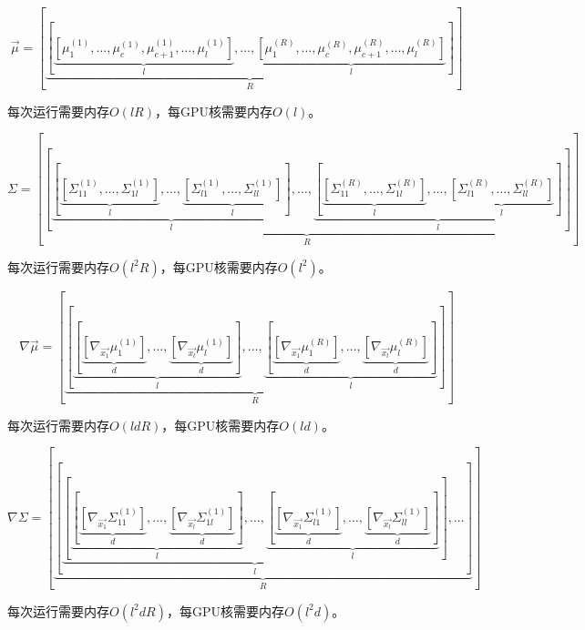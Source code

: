 \documentclass[index]{subfiles}
\begin{document}
\begin{equation}
    \vec{\mu} = \left[ \underbrace{\left[ \underbrace{\left[\mu_{1}^{(1)}, \ldots, \mu_{c}^{(1)}, \mu_{c+1}^{(1)}, \ldots, \mu_{l}^{(1)} \right]}_{l}, \ldots, \underbrace{\left[\mu_{1}^{(R)}, \ldots, \mu_{c}^{(R)}, \mu_{c+1}^{(R)}, \ldots, \mu_{l}^{(R)} \right]}_{l} \right]}_{R} \right]
\end{equation}

每次运行需要内存$O(lR)$，每GPU核需要内存$O(l)$。

\begin{equation}
    \Sigma = \left[ \underbrace{ \left[ \underbrace{ \left[ \underbrace{ \left[ \Sigma_{11}^{(1)}, \ldots, \Sigma_{1l}^{(1)} \right]}_{l}, \ldots, \underbrace{ \left[ \Sigma_{l1}^{(1)}, \ldots, \Sigma_{ll}^{(1)} \right]}_{l} \right] }_{l}, \ldots, \underbrace{ \left[ \underbrace{ \left[ \Sigma_{11}^{(R)}, \ldots, \Sigma_{1l}^{(R)} \right]}_{l}, \ldots, \underbrace{ \left[ \Sigma_{l1}^{(R)}, \ldots, \Sigma_{ll}^{(R)} \right]}_{l} \right] }_{l}  \right]}_{R}\right]
\end{equation}

每次运行需要内存$O(l^{2}R)$，每GPU核需要内存$O(l^{2})$。

\begin{equation}
    \nabla \vec{\mu} = \left[ \underbrace{ \left[ \underbrace{ \left[ \underbrace{ \left[ \nabla_{\vec{x_{1}}} \mu_{1}^{(1)} \right]}_{d} , \ldots, \underbrace{ \left[ \nabla_{\vec{x_{l}}} \mu_{l}^{(1)} \right]}_{d}\right]}_{l}, \ldots, \underbrace{ \left[ \underbrace{ \left[ \nabla_{\vec{x_{1}}} \mu_{1}^{(R)} \right]}_{d} , \ldots, \underbrace{ \left[ \nabla_{\vec{x_{l}}} \mu_{l}^{(R)} \right]}_{d}\right]}_{l} \right]}_{R} \right]
\end{equation}

每次运行需要内存$O(ldR)$，每GPU核需要内存$O(ld)$。

\begin{equation}
    \nabla \Sigma = \left[ \underbrace{ \left[ \underbrace{ \left[ \underbrace{ \left[ \underbrace{ \left[ \nabla_{\vec{x_{1}}} \Sigma_{11}^{(1)} \right]}_{d} , \ldots, \underbrace{ \left[ \nabla_{\vec{x_{l}}} \Sigma_{1l}^{(1)} \right]}_{d}\right]}_{l}, \ldots, \underbrace{ \left[ \underbrace{ \left[ \nabla_{\vec{x_{1}}} \Sigma_{l1}^{(1)} \right]}_{d} , \ldots, \underbrace{ \left[ \nabla_{\vec{x_{l}}} \Sigma_{ll}^{(1)} \right]}_{d}\right]}_{l} \right] }_{l}, \ldots \right]}_{R} \right]
\end{equation}

每次运行需要内存$O(l^{2}dR)$，每GPU核需要内存$O(l^{2}d)$。
\end{document}
